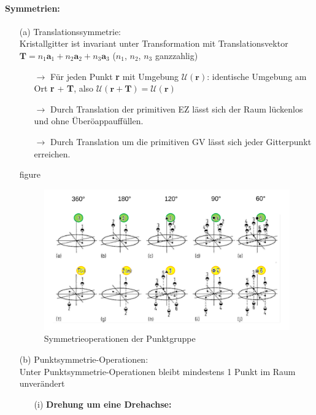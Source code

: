 \paragraph{Symmetrien:}
\begin{itemize}
    \item[(a)] Translationssymmetrie:\\
          Kristallgitter ist invariant unter Transformation mit Translationsvektor $\textbf{T} = n_1 \textbf{a}_1 + n_2 \textbf{a}_2 +n_3 \textbf{a}_3$ ($n_1$, $n_2$, $n_3$ ganzzahlig)
          \begin{itemize}
              \item[$\rightarrow$] Für jeden Punkt \textbf{r} mit Umgebung $\mathcal{U} (\textbf{r})$: identische Umgebung am Ort \textbf{r} + \textbf{T}, also $\mathcal{U} (\textbf{r} + \textbf{T}) = \mathcal{U} (\textbf{r})$
              \item[$\rightarrow$] Durch Translation der primitiven EZ lässt sich der Raum lückenlos und ohne Überöappauffüllen.
              \item[$\rightarrow$] Durch Translation um die primitiven GV lässt sich jeder Gitterpunkt erreichen.
          \end{itemize}
          {figure}\begin{figure}[H]
            \centering
            \includegraphics[width=\textwidth]{figures/2_1Symmetrie}
            \caption{Symmetrieoperationen der Punktgruppe}
            \label{}
        \end{figure}
    \item[(b)] Punktsymmetrie-Operationen:\\
          Unter Punktsymmetrie-Operationen bleibt mindestens 1 Punkt im Raum unverändert
          \begin{itemize}
              \item[(i)] \textbf{Drehung um eine Drehachse:}\\

\end{itemize}
\end{itemize}
